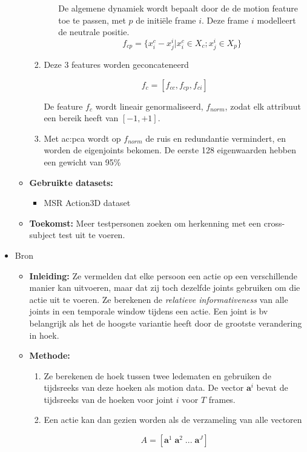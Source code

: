 \begin{itemize}
\begin{itemize}
\begin{enumerate}
\begin{enumerate}
				
				De algemene dynamiek wordt bepaalt door de de motion feature toe te passen, met $p$ de initiële frame $i$. Deze frame $i$ modelleert de neutrale positie.
				$$f_{cp} = \{x_i^c - x_j^i | x_i^c \in X_c; x_j^i \in X_p\}$$
			\end{enumerate}
			\item Deze 3 features worden geconcateneerd
			
			$$f_c = [f_{cc}, f_{cp}, f_{ci}]$$
			
			De feature $f_c$ wordt lineair genormaliseerd, $f_{norm}$, zodat elk attribuut een bereik heeft van $[-1, +1]$.
			
			\item Met \gls{ac:pca} wordt op $f_{norm}$ de ruis en redundantie vermindert, en worden de eigenjoints bekomen. De eerste 128 eigenwaarden hebben een gewicht van 95\%
		\end{enumerate}
		\item \textbf{Gebruikte datasets:}
		\begin{itemize}
			\item MSR Action3D dataset
		\end{itemize}
		\item \textbf{Toekomst:}
		Meer testpersonen zoeken om herkenning met een cross-subject test uit te voeren.
	\end{itemize}

	\item Bron \cite{Ofli2012}
	\begin{itemize}
		\item \textbf{Inleiding:} Ze vermelden dat elke persoon een actie op een verschillende manier kan uitvoeren, maar dat zij toch dezelfde joints gebruiken om die actie uit te voeren. Ze berekenen de \textit{relatieve informativeness} van alle joints in een temporale window tijdens een actie. Een joint is bv belangrijk als het de hoogste variantie heeft door de grootste verandering in hoek.
		\item \textbf{Methode:} 
		\begin{enumerate}
			\item Ze berekenen de hoek tussen twee ledematen en gebruiken de tijdsreeks van deze hoeken als motion data. De vector $\textbf{a}^i$ bevat de tijdsreeks van de hoeken voor joint $i$ voor $T$ frames.
			\item Een actie kan dan gezien worden als de verzameling van alle vectoren
			
			$$A = [\textbf{a}^1\; \textbf{a}^2\; ...\; \textbf{a}^J]$$
			

\end{enumerate}
\end{itemize}
\end{itemize}
